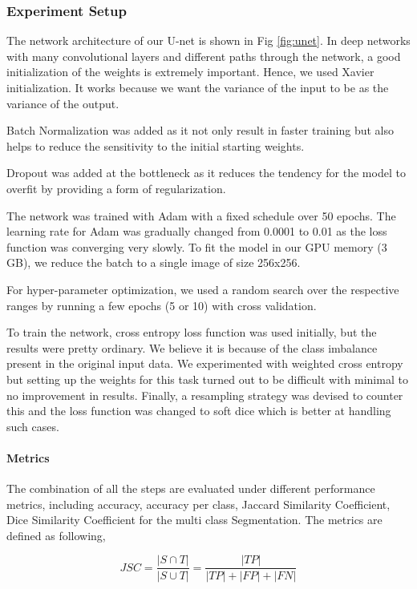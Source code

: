\documentclass[conference]{IEEEtran}
\begin{document}
\subsubsection{Experiment Setup}
\label{sssec:setup}

The network architecture of our U-net is shown in Fig \ref{fig:unet}. In deep networks with many convolutional layers and different paths through the network, a good initialization of the weights is extremely important. Hence, we used Xavier initialization. It works because we want the variance of the input to be as the variance of the output.
\par 
Batch Normalization was added as it not only result in faster training but also helps to reduce the sensitivity to the initial starting weights.
\par
Dropout was added at the bottleneck as it reduces the tendency for the model to overfit by providing a form of regularization.
\par
The network was trained with Adam with a fixed schedule over 50 epochs. The learning rate for Adam was gradually changed from 0.0001 to 0.01 as the loss function was converging very slowly. To fit the model in our GPU memory (3 GB), we reduce the batch to a single image of size 256x256.
\par
For hyper-parameter optimization, we used a random search over the respective ranges by running a few epochs (5 or 10) with cross validation.
\par
To train the network, cross entropy loss function was used initially, but the results were pretty ordinary. We believe it is because of the class imbalance present in the original input data. We experimented with weighted cross entropy but setting up the weights for this task turned out to be difficult with minimal to no improvement in results. Finally, a resampling strategy was devised to counter this and the loss function was changed to soft dice which is better at handling such cases.

\paragraph{Metrics}
\label{paragraph:metrics}
The combination of all the steps are evaluated under different performance metrics, including accuracy, accuracy per class, Jaccard Similarity Coefficient, Dice Similarity Coefficient for the multi class Segmentation. The metrics are defined as following,

\begin{equation}
JSC = \frac{|S \cap T|}{|S \cup T|} = \frac{|TP|}{|TP| + |FP| + |FN|}
\end{equation}
\end{document}
